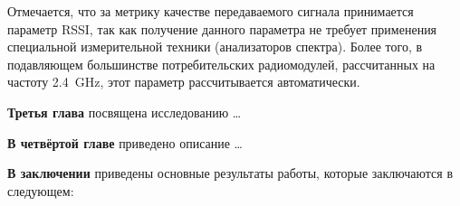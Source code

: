 Отмечается, что за метрику качестве передаваемого сигнала принимается параметр RSSI, так как получение данного параметра не требует применения специальной измерительной техники (анализаторов спектра). Более того, в подавляющем большинстве потребительских радиомодулей, рассчитанных на частоту \SI{2,4}{\giga\hertz}, этот параметр рассчитывается автоматически.  

\textbf{Третья глава} посвящена исследованию \dots

\textbf{В четвёртой главе} приведено описание \dots

\FloatBarrier                      
\textbf{В заключении} приведены основные результаты работы, которые заключаются в следующем:


